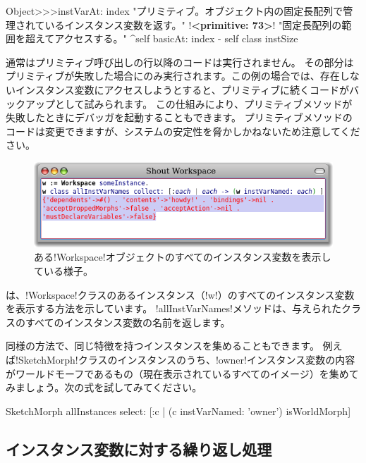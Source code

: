\documentclass[a4paper,10pt,twoside]{book}
\begin{document}
\begin{code}{}
Object>>>instVarAt: index 
	"プリミティブ。オブジェクト内の固定長配列で管理されているインスタンス変数を返す。"
	!\textbf{<primitive: 73>}!
	"固定長配列の範囲を超えてアクセスする。"
	^self basicAt: index - self class instSize		
\end{code}

通常はプリミティブ呼び出しの行以降のコードは実行されません。
その部分はプリミティブが失敗した場合にのみ実行されます。この例の場合では、存在しないインスタンス変数にアクセスしようとすると、プリミティブに続くコードがバックアップとして試みられます。
この仕組みにより、プリミティブメソッドが失敗したときにデバッガを起動することもできます。
プリミティブメソッドのコードは変更できますが、\pharo システムの安定性を脅かしかねないため注意してください。

\begin{figure}[ht]\centering
	\includegraphics[width=\linewidth]{allInstanceVariables}
	\caption{ある\ct!Workspace!オブジェクトのすべてのインスタンス変数を表示している様子。}
\end{figure}

は、\ct!Workspace!クラスのあるインスタンス（\ct!w!）のすべてのインスタンス変数を表示する方法を示しています。
\ct!allInstVarNames!メソッドは、与えられたクラスのすべてのインスタンス変数の名前を返します。

同様の方法で、同じ特徴を持つインスタンスを集めることもできます。
例えば\ct!SketchMorph!クラスのインスタンスのうち、\ct!owner!インスタンス変数の内容がワールドモーフであるもの（\ie 現在表示されているすべてのイメージ）を集めてみましょう。次の式を試してみてください。

\begin{code}{}
SketchMorph allInstances select: [:c | (c instVarNamed: 'owner') isWorldMorph]
\end{code}

\subsection{インスタンス変数に対する繰り返し処理}
\end{document}
